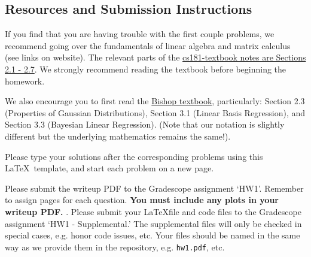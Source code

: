 \documentclass[submit]{../harvardml}
\begin{document}
\subsection*{Resources and Submission Instructions}
If you find that you are having trouble with the first couple problems, we recommend going over the fundamentals of linear algebra and matrix calculus (see links on website).  The relevant parts of the \href{https://github.com/harvard-ml-courses/cs181-textbook/blob/master/Textbook.pdf}{cs181-textbook notes are Sections 2.1 - 2.7}.  We strongly recommend reading the textbook before beginning the homework.

We also encourage you to first read the
\href{http://users.isr.ist.utl.pt/~wurmd/Livros/school/Bishop\%20-\%20Pattern\%20Recognition\%20And\%20Machine\%20Learning\%20-\%20Springer\%20\%202006.pdf}{Bishop textbook}, particularly: Section 2.3 (Properties of Gaussian Distributions), Section 3.1 (Linear Basis Regression), and Section 3.3 (Bayesian Linear Regression). (Note that our notation is slightly different but the underlying mathematics remains the same!).

Please type your solutions after the corresponding problems using this \LaTeX\ template, and start each problem on a new page.

Please submit the writeup PDF to the Gradescope assignment `HW1'. Remember to assign pages for each question.  \textbf{You must include any plots in your writeup PDF. }. Please submit your \LaTeX file and code files to the Gradescope assignment `HW1 - Supplemental.' The supplemental files will only be checked in special cases, e.g. honor code issues, etc. Your files should be named in the same way as we provide them in the repository, e.g. \texttt{hw1.pdf}, etc.
\end{document}

